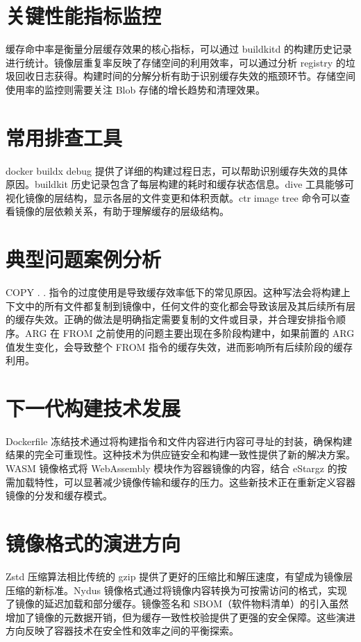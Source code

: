 \chapter{关键性能指标监控}
缓存命中率是衡量分层缓存效果的核心指标，可以通过 buildkitd 的构建历史记录进行统计。镜像层重复率反映了存储空间的利用效率，可以通过分析 registry 的垃圾回收日志获得。构建时间的分解分析有助于识别缓存失效的瓶颈环节。存储空间使用率的监控则需要关注 Blob 存储的增长趋势和清理效果。\par
\chapter{常用排查工具}
docker buildx debug 提供了详细的构建过程日志，可以帮助识别缓存失效的具体原因。buildkit 历史记录包含了每层构建的耗时和缓存状态信息。dive 工具能够可视化镜像的层结构，显示各层的文件变更和体积贡献。ctr image tree 命令可以查看镜像的层依赖关系，有助于理解缓存的层级结构。\par
\chapter{典型问题案例分析}
COPY . . 指令的过度使用是导致缓存效率低下的常见原因。这种写法会将构建上下文中的所有文件都复制到镜像中，任何文件的变化都会导致该层及其后续所有层的缓存失效。正确的做法是明确指定需要复制的文件或目录，并合理安排指令顺序。ARG 在 FROM 之前使用的问题主要出现在多阶段构建中，如果前置的 ARG 值发生变化，会导致整个 FROM 指令的缓存失效，进而影响所有后续阶段的缓存利用。\par
\chapter{下一代构建技术发展}
Dockerfile 冻结技术通过将构建指令和文件内容进行内容可寻址的封装，确保构建结果的完全可重现性。这种技术为供应链安全和构建一致性提供了新的解决方案。WASM 镜像格式将 WebAssembly 模块作为容器镜像的内容，结合 eStargz 的按需加载特性，可以显著减少镜像传输和缓存的压力。这些新技术正在重新定义容器镜像的分发和缓存模式。\par
\chapter{镜像格式的演进方向}
Zstd 压缩算法相比传统的 gzip 提供了更好的压缩比和解压速度，有望成为镜像层压缩的新标准。Nydus 镜像格式通过将镜像内容转换为可按需访问的格式，实现了镜像的延迟加载和部分缓存。镜像签名和 SBOM（软件物料清单）的引入虽然增加了镜像的元数据开销，但为缓存一致性校验提供了更强的安全保障。这些演进方向反映了容器技术在安全性和效率之间的平衡探索。\par
